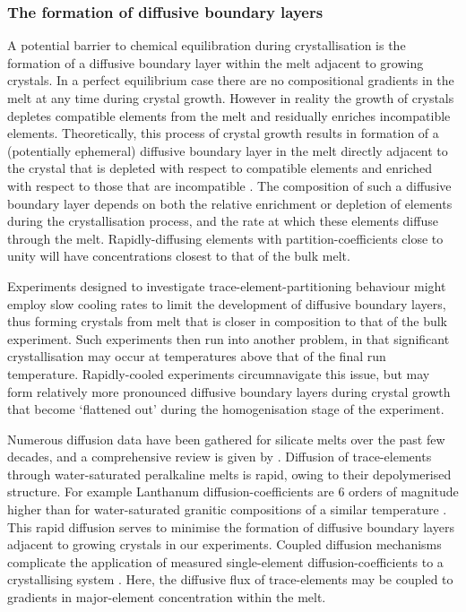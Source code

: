 \documentclass[review,authoryear,12pt]{elsarticle}
\begin{document}
\subsubsection{The formation of diffusive boundary layers}
A potential barrier to chemical equilibration during crystallisation is the formation of a diffusive boundary layer within the melt adjacent to growing crystals. In a perfect equilibrium case there are no compositional gradients in the melt at any time during crystal growth. However in reality the growth of crystals depletes compatible elements from the melt and residually enriches incompatible elements. 
    Theoretically, this process of crystal growth results in formation of a (potentially ephemeral) diffusive boundary layer in the melt directly adjacent to the crystal that is depleted with respect to compatible elements and enriched with respect to those that are incompatible \citep{Lu1995}. The composition of such a diffusive boundary layer depends on both the relative enrichment or depletion of elements during the crystallisation process, and the rate at which these elements diffuse through the melt. Rapidly-diffusing elements with partition-coefficients close to unity will have concentrations closest to that of the bulk melt.

Experiments designed to investigate trace-element-partitioning behaviour might employ slow cooling rates to limit the development of diffusive boundary layers, thus forming crystals from melt that is closer in composition to that of the bulk experiment. Such experiments then run into another problem, in that significant crystallisation may occur at temperatures above that of the final run temperature. Rapidly-cooled experiments circumnavigate this issue, but may form relatively more pronounced diffusive boundary layers during crystal growth that become `flattened out' during the homogenisation stage of the experiment.

Numerous diffusion data have been gathered for silicate melts over the past few decades, and a comprehensive review is given by \citet{Zhang2010}. Diffusion of trace-elements through water-saturated peralkaline melts is rapid, owing to their depolymerised structure. For example Lanthanum diffusion-coefficients are 6 orders of magnitude higher than for water-saturated granitic compositions of a similar temperature \citep[compare][]{Rapp1986,Behrens2009}. This rapid diffusion serves to minimise the formation of diffusive boundary layers adjacent to growing crystals in our experiments.
Coupled diffusion mechanisms complicate the application of measured single-element diffusion-coefficients to a crystallising system \citep{Grove1984,Liang1994,Costa2003}. Here, the diffusive flux of trace-elements may be coupled to gradients in major-element concentration within the melt. 
\end{document}
